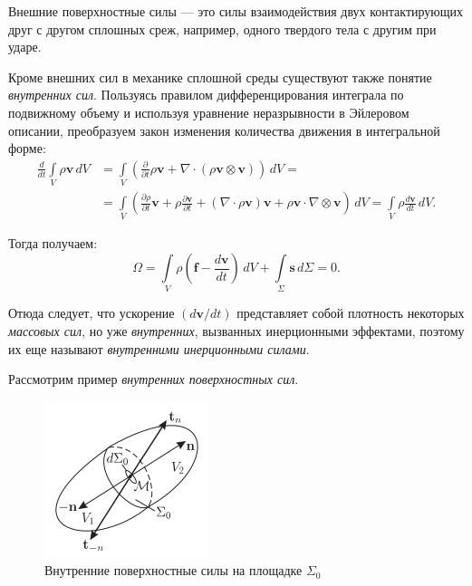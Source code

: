 Внешние поверхностные силы --- это силы взаимодействия двух контактирующих друг с другом сплошных среж, например, одного твердого тела с другим при ударе. 

Кроме внешних сил в механике сплошной среды существуют также понятие \textit{внутренних сил}. Пользуясь правилом дифференцирования интеграла по подвижному объему и используя уравнение неразрывности в Эйлеровом описании, преобразуем закон изменения количества движения в интегральной форме:
\begin{align*}
	\frac{d}{dt} \int\limits_{V} \rho \mathbf{v} \, dV &= \int\limits_{V}\left(\frac{\partial}{\partial t} \rho \mathbf{v} + \nabla \cdot \left(\rho \mathbf{v} \otimes \mathbf{v}\right)\right) \, dV = \\
	&= \int\limits_{V} \left(\frac{\partial \rho}{\partial t} \mathbf{v} + \rho \frac{\partial \mathbf{v}}{\partial t} + (\nabla \cdot \rho \mathbf{v}) \mathbf{v} + \rho \mathbf{v} \cdot \nabla \otimes \mathbf{v}\right) \, dV = \int\limits_{V} \rho \frac{d \mathbf{v}}{d t} \, dV.
\end{align*}

Тогда получаем: 
\begin{equation*} \tag{$\ast$} \label{omega}
	\Omega = \int\limits_{V} \rho \left(\mathbf{f} - \frac{d \mathbf{v}}{dt}\right) \, dV + \int\limits_{\Sigma} \mathbf{s} \, d\Sigma = 0.
\end{equation*}

Отюда следует, что ускорение $(d \mathbf{v} / dt)$ представляет собой плотность некоторых \textit{массовых сил}, но уже \textit{внутренних}, вызванных инерционными эффектами, поэтому их еще называют \textit{внутренними инерционными силами}. 

Рассмотрим пример \textit{внутренних поверхностных сил}. 

\begin{figure}
	\centering
	\includegraphics[width=0.7\linewidth]{img/que16}
	\caption{Внутренние поверхностные силы на площадке $\Sigma_0$}
	\label{fig:que16}
\end{figure}


